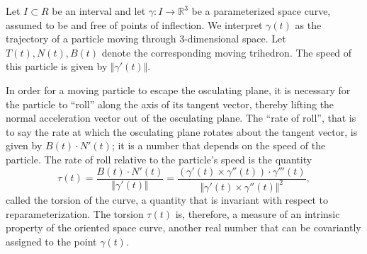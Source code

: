 \documentclass[12pt]{article}
\newcommand{\reals}{\mathbb{R}}
\begin{document}
Let $I\subset R$ be an interval and let $\gamma:I\to\reals^3$ be a
parameterized space curve, assumed to be
 and free of points of inflection. We
interpret $\gamma(t)$ as the trajectory of a particle moving through
3-dimensional space. Let $T(t), N(t), B(t)$ denote the corresponding
moving trihedron. The speed of this particle is given by $\Vert
\gamma'(t) \Vert$.

In order for a moving particle to escape the osculating plane, it is
necessary for the particle to ``roll'' along the axis of its tangent
vector, thereby lifting the normal acceleration vector out of the
osculating plane. The ``rate of roll'', that is to say the rate at
which the osculating plane rotates about the tangent vector, is given
by $B(t)\cdot N'(t)$; it is a number that depends on the
speed of the particle. The rate of roll relative to the particle's
speed is the quantity
$$\tau(t) = \frac{B(t)\cdot N'(t)}{\Vert \gamma'(t)\Vert}= \frac{(
\gamma'(t)\times \gamma''(t)) \cdot \gamma'''(t)}{\Vert \gamma'(t)\times
\gamma''(t)\Vert^2 },$$
called the torsion of the curve, a quantity
that is invariant with respect to reparameterization. The torsion
$\tau(t)$ is, therefore, a measure of an intrinsic property of the
oriented space curve, another real number that can be covariantly
assigned to the point $\gamma(t)$.
\end{document}
